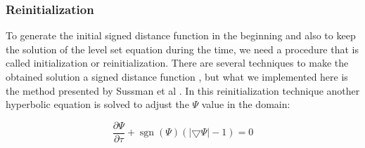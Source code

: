 \documentclass[letterpaper,10pt]{article}
\DeclareMathOperator{\sgn}{sgn}
\begin{document}
%
%
%
% 
% 
%         

\subsubsection{Reinitialization} \label{reinitialization}

To generate the initial signed distance function in the beginning and also to keep the solution of the level set equation during 
the time, we need a procedure that is called initialization or reinitialization. There are several techniques to make the obtained 
solution a signed distance function \cite{Osher1988}, but what we implemented here is the method presented by 
Sussman et al \cite{Sussman1994}. In this reinitialization technique another hyperbolic equation is solved to adjust the $\varPsi$ value 
in the domain:

\begin{equation}\label{initializationeq}
	\frac{\partial \varPsi}{\partial \tau} + \sgn (\varPsi) (|\bigtriangledown \varPsi| - 1)= 0 
\end{equation}
\end{document}
